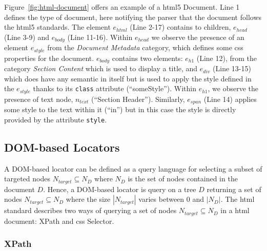 Figure~\ref{fig:html-document} offers an example of a \gls{html}5 Document. Line 1 defines the type of document, here notifying the parser that the document follows the \gls{html}5 standards. The element $e_{html}$ (Line 2-17) contains to children, $e_{head}$ (Line 3-9) and $e_{body}$ (Line 11-16). Within $e_{head}$ we observe the presence of an element $e_{style}$ from the \emph{Document Metadata} category, which defines some \gls{css} properties for the document. $e_{body}$ contains two elements: $e_{h1}$ (Line 12), from the category \emph{Section Content} which is used to display a title, and $e_{div}$ (Line 13-15) which does have any semantic in itself but is used to apply the style defined in the $e_{style}$ thanks to its \texttt{class} attribute (``someStyle''). Within $e_{h1}$, we observe the presence of text node, $n_{text}$ (``Section Header''). Similarly, $e_{span}$ (Line 14) applies some style to the text within it (``in'') but in this case the style is directly provided by the attribute \texttt{style}.

\subsection{DOM-based Locators}
\label{sec:hpath-introduction-locators}

A DOM-based locator can be defined as a query language for selecting a subset of targeted nodes $N_{target} \subseteq N_D$ where $N_D$ is the set of nodes contained in the document $D$. Hence, a DOM-based locator is query on a tree $D$ returning a set of nodes $N_{target} \subseteq N_D$ where the size $|N_{target}|$ varies between 0 and $|N_D|$. The \gls{html} standard describes two ways of querying a set of nodes $N_{target} \subseteq N_D$ in a \gls{html} document: XPath and \gls{css} Selector. 

\subsubsection{XPath}
\label{sec:hpath-introduction-xpath}

